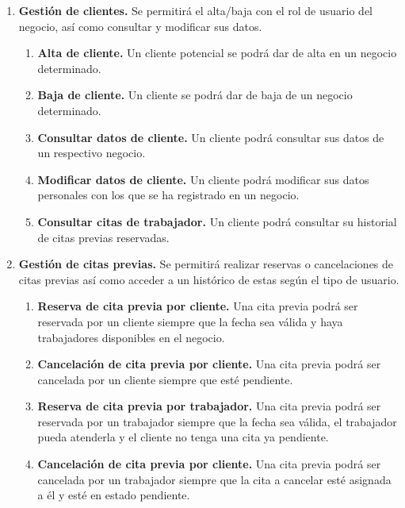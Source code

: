 \begin{enumerate}[leftmargin=1.75cm,start=1,label={\bfseries RF-\arabic*.}]
    \item \textbf{Gestión de clientes.} Se permitirá el alta/baja con el rol de usuario del negocio,
    así como consultar y modificar sus datos.
    \begin{enumerate}[start=1,label={\bfseries RF-3.\arabic*.}]
        \item \textbf{Alta de cliente.} Un cliente potencial se podrá dar de alta en un negocio determinado.
        \item \textbf{Baja de cliente.} Un cliente se podrá dar de baja de un negocio determinado.
        \item \textbf{Consultar datos de cliente.} Un cliente podrá consultar sus datos de un respectivo negocio.
        \item \textbf{Modificar datos de cliente.} Un cliente podrá modificar sus datos personales con los que se ha
        registrado en un negocio.
        \item \textbf{Consultar citas de trabajador.} Un cliente podrá consultar su historial de citas previas
        reservadas.
    \end{enumerate}

    \item \textbf{Gestión de citas previas.} Se permitirá realizar reservas o cancelaciones de citas previas así como
    acceder a un histórico de estas según el tipo de usuario.
    \begin{enumerate}[start=1,label={\bfseries RF-4.\arabic*.}]
        \item \textbf{Reserva de cita previa por cliente.} Una cita previa podrá ser reservada por un cliente siempre
        que la fecha sea válida y haya trabajadores disponibles en el negocio.
        \item \textbf{Cancelación de cita previa por cliente.} Una cita previa podrá ser cancelada por un cliente
        siempre que esté pendiente.
        \item \textbf{Reserva de cita previa por trabajador.} Una cita previa podrá ser reservada por un trabajador
        siempre que la fecha sea válida, el trabajador pueda atenderla y el cliente no tenga una cita ya pendiente.
        \item \textbf{Cancelación de cita previa por cliente.} Una cita previa podrá ser cancelada por un trabajador
        siempre que la cita a cancelar esté asignada a él y esté en estado pendiente.\\
    \end{enumerate}

\end{enumerate}

